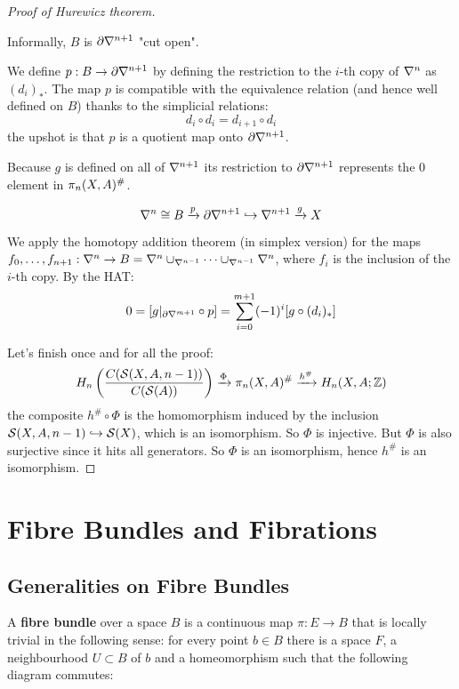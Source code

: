 \begin{proof}[Proof of Hurewicz theorem]
\begin{claimproof}
Informally, $B$ is $\partial\nabla^{n+1}$ "cut open".\alvaropls

We define $p:B\to\partial\nabla^{n+1}$ by defining the restriction to the $i$-th copy of $\nabla^n$ as $(d_i)_*$. The map $p$ is compatible with the equivalence relation (and hence well defined on $B$) thanks to the simplicial relations:
\[d_i\circ d_i=d_{i+1}\circ d_i\]
the upshot is that $p$ is a quotient map onto $\partial\nabla^{n+1}$.

Because $g$ is defined on all of $\nabla^{n+1}$ its restriction to $\partial\nabla^{n+1}$ represents the $0$ element in $\pi_n(X,A)^\#$.

\[\nabla^n\cong B\xrightarrow{p}\partial\nabla^{n+1}\hookrightarrow\nabla^{n+1}\xrightarrow{g}X\]

We apply the homotopy addition theorem (in simplex version) for the maps ${{f}_0,\dots,{f}_{n+1}}:\nabla^{n}\to B=\nabla^{n}\cup_{\nabla^{n-1}}\dots\cup_{\nabla^{n-1}}\nabla^{n}$, where $f_i$ is the inclusion of the $i$-th copy.
By the HAT:
\[0=[g|_{\partial \nabla^{m+1}}\circ p]=\sum_{i=0}^{m+1}(-1)^i[g\circ (d_i)_*]\]

\end{claimproof}

Let's finish once and for all the proof:
\[H_n\left(\frac{C(\mathcal{S}(X,A,n-1))}{C(\mathcal{S}(A))}\right)\xrightarrow{\Phi}\pi_n(X,A)^\#\xrightarrow{h^\#}H_n(X,A;{\mathbb Z})\]
the composite $h^\#\circ\Phi$ is the homomorphism induced by the inclusion $\mathcal{S}(X,A,n-1)\hookrightarrow \mathcal{S}(X)$, which is an isomorphism. So $\Phi$ is injective. But $\Phi$ is also surjective since it hits all generators. So $\Phi$ is an isomorphism, hence $h^\#$ is an isomorphism.
\end{proof}



\chapter{Fibre Bundles and Fibrations}

\section{Generalities on Fibre Bundles}

A \textbf{fibre bundle} over a space $B$ is a continuous map $\pi:E\to B$ that is locally trivial in the following sense: for every point $b\in B$ there is a space $F$, a neighbourhood $U\subset B$ of $b$ and a homeomorphism such that the following diagram commutes:
\begin{center}
\end{center}

